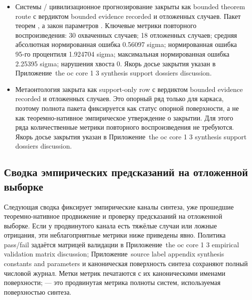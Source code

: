 \begin{itemize}[leftmargin=1.6em,nosep]
\item Системы / цивилизационное прогнозирование закрыты как bounded theorem route с вердиктом bounded evidence recorded и  отложенных случаев. Пакет теорем , а закон параметров . Ключевые метрики повторного воспроизведения: 30 охваченных случаев; 18 отложенных случаев; средняя абсолютная нормированная ошибка 0.56097 sigma; нормированная ошибка 95-го процентиля 1.924704 sigma; максимальная нормированная ошибка 2.25395 sigma; нарушения хвоста 0. Якорь досье закрытия указан в Приложение~the oc core 1 3 synthesis support dossiers discussion.
\item Метаонтология закрыта как support-only row с вердиктом bounded evidence recorded и  отложенных случаев. Это опорный ряд только для каркаса, поэтому полнота пакета фиксируется как статус опорной поверхности, а не как теоремно-нативное эмпирическое утверждение о закрытии. Для этого ряда количественные метрики повторного воспроизведения не требуются. Якорь досье закрытия указан в Приложение~the oc core 1 3 synthesis support dossiers discussion.
\end{itemize}

\subsection{Сводка эмпирических предсказаний на отложенной выборке}
Следующая сводка фиксирует эмпирические каналы синтеза, уже прошедшие теоремно-нативное продвижение и проверку предсказаний на отложенной выборке.
Если у продвинутого канала есть тяжёлые случаи или ложные отрицания, эти неблагоприятные метрики ниже приведены явно. Политика pass/fail задаётся матрицей валидации в Приложение~the oc core 1 3 empirical validation matrix discussion; Приложение~source label appendix synthesis constants and parameters и каноническая поверхность синтеза сохраняют полный числовой журнал.
Метки метрик печатаются с их каноническими именами поверхности;  — это продвинутая метрика полноты систем, используемая поверхностью синтеза.

